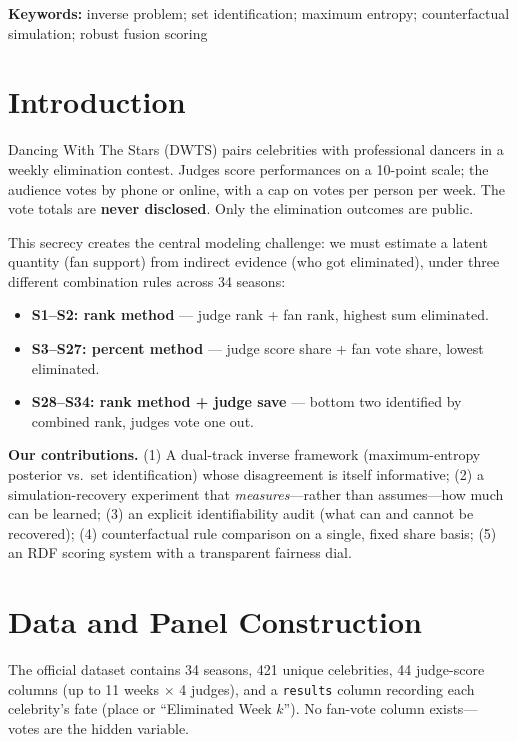 \documentclass[12pt]{article}
\begin{document}
\textbf{Keywords:} inverse problem; set identification; maximum entropy; counterfactual
simulation; robust fusion scoring

\newpage
\tableofcontents
\newpage

\section{Introduction}
Dancing With The Stars (DWTS) pairs celebrities with professional dancers in a weekly
elimination contest. Judges score performances on a 10-point scale; the audience votes
by phone or online, with a cap on votes per person per week. The vote totals are
\textbf{never disclosed}. Only the elimination outcomes are public.

This secrecy creates the central modeling challenge: we must estimate a latent quantity
(fan support) from indirect evidence (who got eliminated), under three different
combination rules across 34 seasons:
\begin{itemize}
\item \textbf{S1--S2: rank method} --- judge rank + fan rank, highest sum eliminated.
\item \textbf{S3--S27: percent method} --- judge score share + fan vote share, lowest eliminated.
\item \textbf{S28--S34: rank method + judge save} --- bottom two identified by combined rank, judges vote one out.
\end{itemize}

\textbf{Our contributions.} (1) A dual-track inverse framework (maximum-entropy
posterior vs.\ set identification) whose disagreement is itself informative;
(2) a simulation-recovery experiment that \emph{measures}---rather than assumes---how
much can be learned; (3) an explicit identifiability audit (what can and cannot be
recovered); (4) counterfactual rule comparison on a single, fixed share basis;
(5) an RDF scoring system with a transparent fairness dial.

\section{Data and Panel Construction}
\label{sec:panel}

The official dataset contains 34 seasons, 421 unique celebrities, 44 judge-score
columns (up to 11 weeks $\times$ 4 judges), and a \texttt{results} column recording
each celebrity's fate (place or ``Eliminated Week $k$''). No fan-vote column exists---
votes are the hidden variable.
\end{document}
